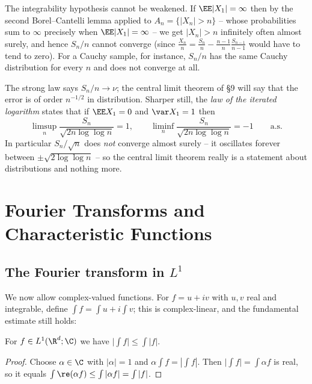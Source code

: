 \begin{remark}
	The integrability hypothesis cannot be weakened. If $\EE|X_1|=\infty$ then by the second Borel--Cantelli lemma applied to $A_n = \{|X_n|>n\}$ -- whose probabilities sum to $\infty$ precisely when $\EE|X_1|=\infty$ -- we get $|X_n|>n$ infinitely often almost surely, and hence $S_n/n$ cannot converge (since $\frac{X_n}{n} = \frac{S_n}{n}-\frac{n-1}{n}\frac{S_{n-1}}{n-1}$ would have to tend to zero). For a Cauchy sample, for instance, $S_n/n$ has the same Cauchy distribution for every $n$ and does not converge at all.
\end{remark}

\begin{remark}
	The strong law says $S_n/n \to \nu$; the central limit theorem of \S9 will say that the error is of order $n^{-1/2}$ in distribution. Sharper still, the \emph{law of the iterated logarithm} states that if $\EE X_1 = 0$ and $\var X_1 = 1$ then
	$$
	\limsup_n \frac{S_n}{\sqrt{2n\log\log n}} = 1, \qquad \liminf_n \frac{S_n}{\sqrt{2n\log\log n}}=-1 \qquad \text{a.s.}
	$$
	In particular $S_n/\sqrt n$ does \emph{not} converge almost surely -- it oscillates forever between $\pm\sqrt{2\log\log n}$ -- so the central limit theorem really is a statement about distributions and nothing more.
\end{remark}
\section{Fourier Transforms and Characteristic Functions}

\subsection{The Fourier transform in \texorpdfstring{$L^1$}{L1}}

We now allow complex-valued functions. For $f = u + iv$ with $u,v$ real and integrable, define $\int f = \int u + i\int v$; this is complex-linear, and the fundamental estimate still holds:

\begin{lemma}
	For $f \in L^1(\R^d;\C)$ we have $\big|\int f\big| \leq \int|f|$.
\end{lemma}
\begin{proof}
	Choose $\alpha \in \C$ with $|\alpha|=1$ and $\alpha\int f = |\int f|$. Then $\big|\int f\big| = \int \alpha f$ is real, so it equals $\int \re(\alpha f) \leq \int |\alpha f| = \int|f|$.
\end{proof}

